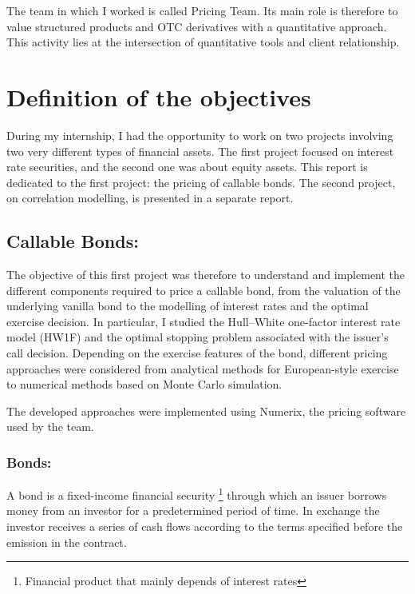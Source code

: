 \documentclass{article}
\begin{document}
The team in which I worked is called Pricing Team. Its main role is therefore to value structured products and OTC derivatives with a quantitative approach. This activity lies at the intersection of quantitative tools and client relationship.



\section{Definition of the objectives}

During my internship, I had the opportunity to work on two projects involving two very different types of financial assets. The first project focused on interest rate securities, and the second one was about equity assets. This report is dedicated to the first project: the pricing of callable bonds. The second project, on correlation modelling, is presented in a separate report.

\subsection{Callable Bonds:}


The objective of this first project was therefore to understand and implement the different components required to price a callable bond, from the valuation of the underlying vanilla bond to the modelling of interest rates and the optimal exercise decision. In particular, I studied the Hull–White one-factor interest rate model (HW1F) and the optimal stopping problem associated with the issuer’s call decision. Depending on the exercise features of the bond, different pricing approaches were considered from analytical methods for European-style exercise to numerical methods based on Monte Carlo simulation.

The developed approaches were implemented using Numerix, the pricing software used by the team.
\\

\subsubsection{Bonds:}


A bond is a fixed-income financial security \footnote{Financial product that mainly depends of interest rates} through which an issuer borrows money from an investor for a predetermined period of time. In exchange the investor receives a series of cash flows according to the terms specified before the emission in the contract. 
\end{document}
